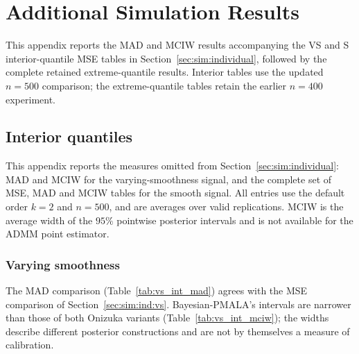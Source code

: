 \section{Additional Simulation Results}
\label{app:simulation_results}

This appendix reports the MAD and MCIW results accompanying the VS and S interior-quantile MSE tables in Section~\ref{sec:sim:individual}, followed by the complete retained extreme-quantile results. Interior tables use the updated $n=500$ comparison; the extreme-quantile tables retain the earlier $n=400$ experiment.

\subsection{Interior quantiles}
\label{app:sim:individual}

This appendix reports the measures omitted from Section~\ref{sec:sim:individual}: MAD and MCIW for the varying-smoothness signal, and the complete set of MSE, MAD and MCIW tables for the smooth signal. All entries use the default order $k=2$ and $n=500$, and are averages over valid replications. MCIW is the average width of the $95\%$ pointwise posterior intervals and is not available for the ADMM point estimator.

\subsubsection{Varying smoothness}
\label{app:sim:individual:vs}
The MAD comparison (Table~\ref{tab:vs_int_mad}) agrees with the MSE comparison of Section~\ref{sec:sim:ind:vs}. Bayesian-PMALA's intervals are narrower than those of both Onizuka variants (Table~\ref{tab:vs_int_mciw}); the widths describe different posterior constructions and are not by themselves a measure of calibration.

